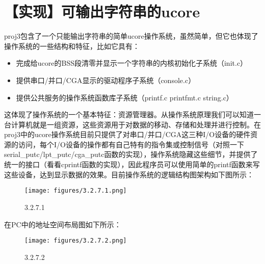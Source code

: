 \section{【实现】可输出字符串的ucore}\label{ux5b9eux73b0ux53efux8f93ux51faux5b57ux7b26ux4e32ux7684ucore}

proj3包含了一个只能输出字符串的简单ucore操作系统，虽然简单，但它也体现了操作系统的一些结构和特征，比如它具有：

\begin{itemize}
\tightlist
\item
  完成给ucore的BSS段清零并显示一个字符串的内核初始化子系统（init.c）
\item
  提供串口/并口/CGA显示的驱动程序子系统（console.c）
\item
  提供公共服务的操作系统函数库子系统（printf.c printfmt.c string.c）
\end{itemize}

这体现了操作系统的一个基本特征：资源管理器。从操作系统原理我们可以知道一台计算机就是一组资源，这些资源用于对数据的移动、存储和处理并进行控制。在proj3中的ucore操作系统目前只提供了对串口/并口/CGA这三种I/O设备的硬件资源的访问，每个I/O设备的操作都有自己特有的指令集或控制信号（对照一下serial\_putc/lpt\_putc/cga\_putc函数的实现），操作系统隐藏这些细节，并提供了统一的接口（看看cprintf函数的实现），因此程序员可以使用简单的printf函数来写这些设备，达到显示数据的效果。目前操作系统的逻辑结构图架构如下图所示：

\begin{figure}[htbp]
\centering
\texttt{[image: figures/3.2.7.1.png]}
\caption{3.2.7.1}
\end{figure}

在PC中的地址空间布局图如下所示：

\begin{figure}[htbp]
\centering
\texttt{[image: figures/3.2.7.2.png]}
\caption{3.2.7.2}
\end{figure}
